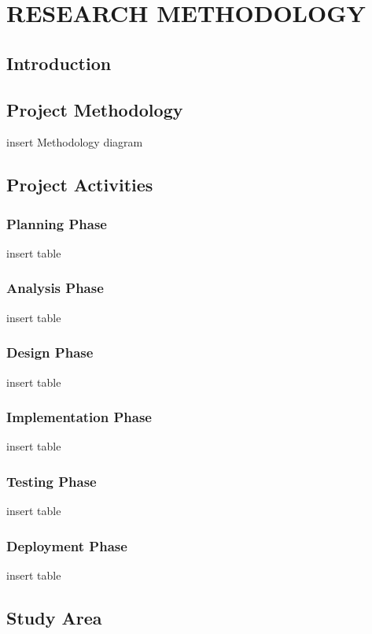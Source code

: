\chapter{RESEARCH METHODOLOGY}
\label{ch:method}

\section{Introduction}

\section{Project Methodology}
insert Methodology diagram

\section{Project Activities}

\subsection{Planning Phase}
insert table

\subsection{Analysis Phase}
insert table

\subsection{Design Phase}
insert table

\subsection{Implementation Phase}
insert table

\subsection{Testing Phase}
insert table

\subsection{Deployment Phase}
insert table

\section{Study Area}

